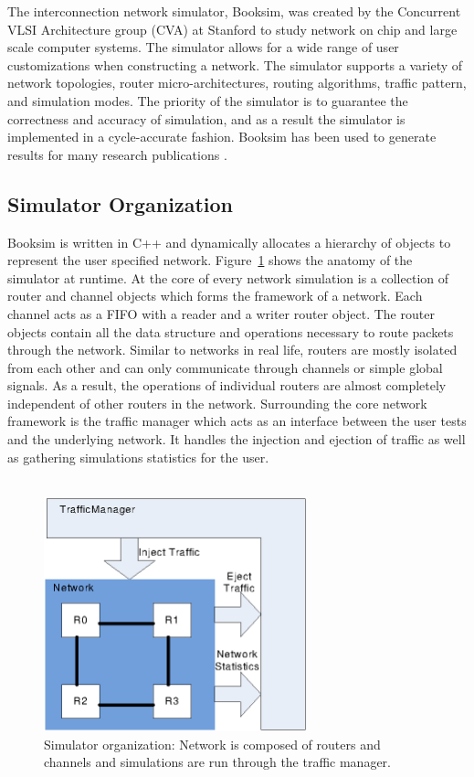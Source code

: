 
The interconnection network simulator, Booksim, was created by the Concurrent VLSI Architecture group (CVA) at Stanford to study network on chip and large scale computer systems. The simulator allows for a wide range of user customizations when constructing a network. The simulator supports a variety of network topologies, router micro-architectures, routing algorithms, traffic pattern, and simulation modes. The priority of the simulator is  to guarantee the correctness and accuracy of simulation, and as a result the simulator is implemented in a cycle-accurate fashion. Booksim has been used to generate results for many research publications \cite{cdragon,KimISCA07,PPIN}. 
\subsection{Simulator Organization}
Booksim is written in C++ and dynamically allocates a hierarchy of objects to represent the user specified network. Figure~\ref{fig:simulator} shows the anatomy of the simulator at runtime. At the core of every network simulation is a collection of router and channel objects which forms the framework of a network. Each channel acts as a FIFO with a reader and a writer router object. The router objects contain all the data structure and operations necessary to route packets through the network. Similar to networks in real life, routers are mostly isolated from each other and can only communicate through channels or simple global signals. As a result, the operations of individual routers are almost completely independent of other routers in the network. Surrounding the core network framework is the traffic manager which acts as an interface between the user tests and the underlying network. It handles the injection and ejection of traffic as well as gathering simulations statistics for the user. \\
~\\
\begin{figure}[h]
\centering
\includegraphics[width=3in]{simulator.eps}
\caption{Simulator organization: Network is composed of routers and channels and simulations are run through the traffic manager. }
\label{fig:simulator}
\end{figure}

